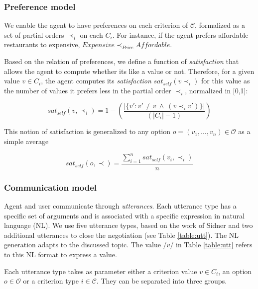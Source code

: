 \documentclass[runningheads,a4paper]{llncs}
\begin{document}
	\subsubsection{Preference model} 
	We enable the agent to have preferences on each criterion of $\mathcal{C}$, formalized as a set of partial orders $\prec_i$ on each $C_i$. For instance, if the agent prefers affordable restaurants to expensive, $Expensive\prec_{Price}Affordable$.
	
	Based on the relation of preferences, we define a function of \emph{satisfaction} that allows the agent to compute whether its like a value or not. Therefore, for a given value $v\in C_i$, the agent computes its \emph{satisfaction} $sat_{self}(v \prec_i)$ for this value as the number of values it prefers less in the partial order $\prec_i$, normalized in [0,1]:

	\begin{equation}
	sat_{self}(v, \prec_i) =	1 - \left( \frac{|\{v' : v' \neq v \  \wedge \ (v \prec_i v')\}| }{( |C_i| - 1 )}\right)
	\end{equation}
	
	This notion of satisfaction is generalized to any option $o= (v_1, \ldots, v_n)\in \mathcal{O}$ as a simple average

	\begin{equation}
	sat_{self}(o, \prec) = \frac{\sum_{i=1}^{n} sat_{self}(v_i, \prec_i) }{n}
	\end{equation}
	
	
	\subsubsection{Communication model}
	\label{Comm}
	Agent and user communicate through \emph{utterances}. Each utterance type has a specific set of arguments and is associated with a specific expression in natural language (NL). We use five utterance types, based on the work of Sidner \cite{sidner1994artificial} and two additional utterances to close the negotiation (see Table \ref{table:utt}). The NL generation adapts to the discussed topic. The value /$v$/ in Table \ref{table:utt} refers to this NL format to express a value.
	
	
	Each utterance type takes as parameter either a criterion value $v \in C_i$, an option $o \in \mathcal{O}$ or a criterion type $i \in \mathcal{C}$. They can be separated into three groups. 
	
\end{document}

